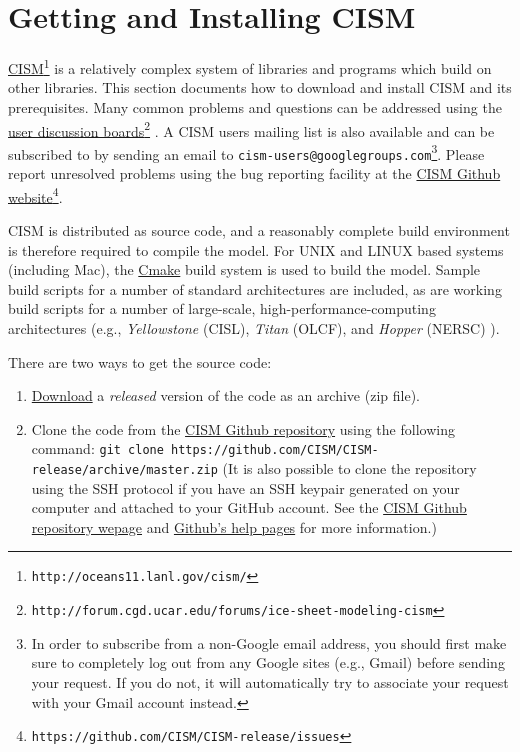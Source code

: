 
\section{Getting and Installing CISM}
\label{sec:getcode}

\href{http://oceans11.lanl.gov/cism/}{CISM}\footnote{\texttt{http://oceans11.lanl.gov/cism/}} 
is a relatively complex system of libraries and programs which build on other libraries. 
This section documents how to download and install CISM and its prerequisites.
Many common problems and questions can be addressed using the 
\href{http://forum.cgd.ucar.edu/forums/ice-sheet-modeling-cism}{user discussion boards}\footnote{\texttt{http://forum.cgd.ucar.edu/forums/ice-sheet-modeling-cism}}
. 
A CISM users mailing list is also available and can be subscribed to by sending an email
to \texttt{cism-users@googlegroups.com}\footnote{In order to subscribe from a non-Google email
address, you should first make sure to completely log out from any Google sites (e.g., Gmail) before sending 
your request. If you do not, it will automatically try to associate your request with your Gmail account instead.}.
Please report unresolved problems using the bug reporting facility at the 
\href{https://github.com/CISM/CISM-release/issues}{CISM Github website}\footnote{\texttt{https://github.com/CISM/CISM-release/issues}}. 

CISM is distributed as source code, and a reasonably complete build environment is therefore required to compile the model. 
For UNIX and LINUX based systems (including Mac), the \href{http://www.cmake.org/}{Cmake} build system is used to build the model. 
Sample build scripts for a number of standard architectures are included, as are working build scripts 
for a number of large-scale, high-performance-computing architectures 
(e.g., \textit{Yellowstone} (CISL), \textit{Titan} (OLCF), and \textit{Hopper} (NERSC) ). 

There are two ways to get the source code:

\begin{enumerate}

\item \href{https://github.com/CISM/CISM-release/archive/master.zip}{Download} a {\it released} version of the code as an archive (zip file). 
\item Clone the code from the \href{https://github.com/CISM/CISM-release}{CISM Github repository} using the following command: 
\texttt{git clone https://github.com/CISM/CISM-release/archive/master.zip}  
(It is also possible to clone the repository using the SSH protocol 
if you have an SSH keypair generated on your computer and attached to your GitHub account.  
See the \href{https://github.com/CISM/CISM-release}{CISM Github repository wepage} and 
\href{https://help.github.com/articles/which-remote-url-should-i-use}{Github's help pages} for more information.)

\end{enumerate}

